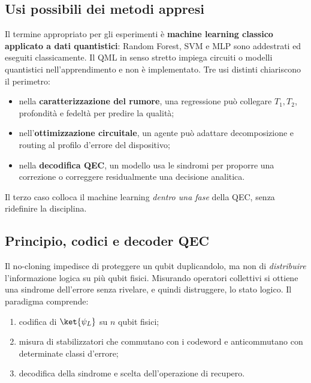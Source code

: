 \subsection{Usi possibili dei metodi appresi}

Il termine appropriato per gli esperimenti è \textbf{machine learning classico
applicato a dati quantistici}: Random Forest, \ac{SVM} e \ac{MLP} sono
addestrati ed eseguiti classicamente. Il \ac{QML} in senso stretto impiega
circuiti o modelli quantistici nell'apprendimento e non è implementato. Tre usi
distinti chiariscono il perimetro:
\begin{itemize}
    \item nella \textbf{caratterizzazione del rumore}, una regressione può
    collegare $T_1,T_2$, profondità e fedeltà per predire la qualità;
    \item nell'\textbf{ottimizzazione circuitale}, un agente può adattare
    decomposizione e routing al profilo d'errore del dispositivo;
    \item nella \textbf{decodifica QEC}, un modello usa le sindromi per
    proporre una correzione o correggere residualmente una decisione analitica.
\end{itemize}
Il terzo caso colloca il machine learning \emph{dentro una fase} della QEC,
senza ridefinire la disciplina.

\subsection{Principio, codici e decoder QEC}
\label{app:qec_richiami_teoria}

Il no-cloning impedisce di proteggere un qubit duplicandolo, ma non di
\emph{distribuire} l'informazione logica su più qubit fisici. Misurando
operatori collettivi si ottiene una sindrome dell'errore senza rivelare, e
quindi distruggere, lo stato logico. Il paradigma comprende:
\begin{enumerate}
    \item codifica di $\ket{\psi_L}$ su $n$ qubit fisici;
    \item misura di stabilizzatori che commutano con i codeword e
    anticommutano con determinate classi d'errore;
    \item decodifica della sindrome e scelta dell'operazione di recupero.
\end{enumerate}

